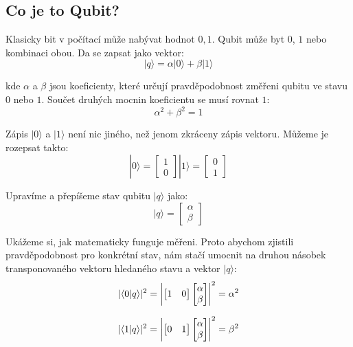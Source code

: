 \documentclass[11pt]{article}
\DeclarePairedDelimiter{\abs}{\lvert}{\rvert}
\begin{document}
\subsection{Co je to Qubit?}
Klasicky bit v počítací může nabývat hodnot ${0, 1}$. Qubit může byt $0$, $1$ nebo kombinaci obou. Da se zapsat jako vektor:
$$|q\rangle = \alpha|0\rangle + \beta|1\rangle$$
\par kde $\alpha$ a $\beta$ jsou koeficienty, které určují pravděpodobnost změřeni qubitu ve stavu $0$ nebo $1$.
Součet druhých mocnin koeficientu se musí rovnat $1$:
$$\alpha^2 + \beta^2 = 1$$
\par Zápis $|0\rangle$ a $|1\rangle$ není nic jiného, než jenom zkráceny zápis vektoru.
Můžeme je rozepsat takto:
$$|0\rangle = \begin{bmatrix}
        1 \\
        0
    \end{bmatrix} |1\rangle = \begin{bmatrix}
        0 \\
        1
    \end{bmatrix}  $$
\par Upravíme a přepíšeme stav qubitu $|q\rangle$ jako:
$$|q\rangle = \begin{bmatrix}
        \alpha \\
        \beta
    \end{bmatrix}$$

\par Ukážeme si, jak matematicky funguje měřeni.
Proto abychom zjistili pravděpodobnost pro konkrétní stav, nám stačí umocnit na druhou násobek transponovaného vektoru hledaného stavu a vektor $|q\rangle$:
$$|\langle 0 | q \rangle|^2 = \abs*{\begin{bmatrix}
            1 & 0
        \end{bmatrix}\begin{bmatrix}
            \alpha \\
            \beta
        \end{bmatrix}}^2 = \alpha ^ 2$$

$$|\langle 1 | q \rangle|^2 = \abs*{\begin{bmatrix}
            0 & 1
        \end{bmatrix}\begin{bmatrix}
            \alpha \\
            \beta
        \end{bmatrix}}^2 = \beta ^ 2$$
\end{document}
